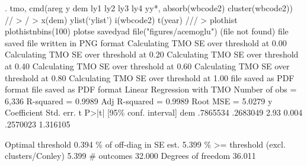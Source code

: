 . tmo, cmd(areg y dem ly1 ly2 ly3 ly4 yy*, absorb(wbcode2) cluster(wbcode2)) //
> /
>     x(dem) ylist(`ylist') i(wbcode2) t(year) ///
>     plothist plothistnbins(100) plotse savedyad file("figures/acemoglu")
(file{} not found)
file{} saved
file {} written in PNG format
Calculating TMO SE over threshold at 0.00
Calculating TMO SE over threshold at 0.20
Calculating TMO SE over threshold at 0.40
Calculating TMO SE over threshold at 0.60
Calculating TMO SE over threshold at 0.80
Calculating TMO SE over threshold at 1.00
file{} saved as PDF format
file{} saved as PDF format
{\smallskip}
Linear Regression with TMO                              Number of obs =  6,336
                                                        R-squared     = 0.9989
                                                        Adj R-squared = 0.9989
                                                        Root MSE      = 5.0279
{\smallskip}
           y {\VBAR} Coefficient  Std. err.      t    P>|t|     [95\% conf. interval]
         dem {\VBAR}   .7865534   .2683049     2.93   0.004     .2570023    1.316105
                                                                               
                                                   Optimal threshold      0.394
                                            \% of off-diag in SE est.      5.399
                              \% >= threshold (excl. clusters/Conley)      5.399
                                                          \# outcomes     32.000
                                                  Degrees of freedom     36.011
